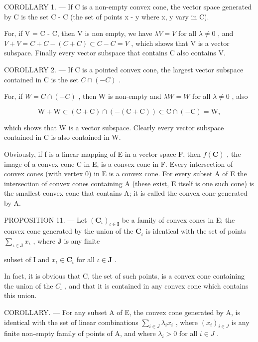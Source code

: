 COROLLARY 1. --- If C is a non-empty convex cone, the vector space generated by C is the set C - C (the set of points x - y where x, y vary in C).

For, if V = C - C, then V is non empty, we have \(\lambda V = V\) for all \(\lambda \neq 0\) , and \(V + V = C + C - (C + C) \subset C - C = V\) , which shows that V is a vector subspace. Finally every vector subspace that contains C also contains V.

COROLLARY 2. --- If C is a pointed convex cone, the largest vector subspace contained in C is the set \(C \cap (-C)\) .

For, if \(W = C \cap (-C)\) , then W is non-empty and \(\lambda W = W\) for all \(\lambda \neq 0\) , also

\[
\mathrm{W} + \mathrm{W} \subset (\mathrm{C} + \mathrm{C}) \cap (- (\mathrm{C} + \mathrm{C})) \subset \mathrm{C} \cap (- \mathrm{C}) = \mathrm{W},
\]

which shows that W is a vector subspace. Clearly every vector subspace contained in C is also contained in W.

Obviously, if f is a linear mapping of E in a vector space F, then \(f(\mathbf{C})\) , the image of a convex cone C in E, is a convex cone in F. Every intersection of convex cones (with vertex 0) in E is a convex cone. For every subset A of E the intersection of convex cones containing A (these exist, E itself is one such cone) is the smallest convex cone that contains A; it is called the convex cone generated by A.

PROPOSITION 11. --- Let \((\mathbf{C}_{\iota})_{\iota \in \mathbf{I}}\) be a family of convex cones in E; the convex cone generated by the union of the \(\mathbf{C}_{\iota}\) is identical with the set of points \(\sum_{\iota \in \mathbf{J}} x_{\iota}\) , where \(\mathbf{J}\) is any finite

subset of I and \(x_{\iota} \in \mathbf{C}_{\iota}\) for all \(\iota \in \mathbf{J}\) .

In fact, it is obvious that C, the set of such points, is a convex cone containing the union of the \(C_{\iota}\) , and that it is contained in any convex cone which contains this union.

COROLLARY. --- For any subset A of E, the convex cone generated by A, is identical with the set of linear combinations \(\sum_{i\in J}\lambda_{i}x_{i}\) , where \((x_{i})_{i\in J}\) is any finite non-empty family of points of A, and where \(\lambda_{i}>0\) for all \(i\in J\) .

